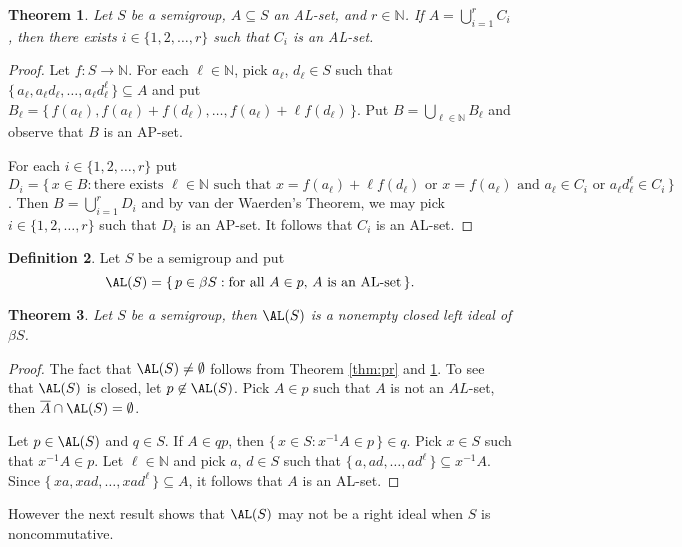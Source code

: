 \documentclass[12pt]{article}
\theoremstyle{plain}
\newtheorem{thm}{Theorem}[section]
\theoremstyle{definition}
\newtheorem{defn}[thm]{Definition}
\newcommand{\bbN}{\mathbb{N}}
\begin{document}
\begin{thm}
  \label{thm:vdwAL}
  Let $S$ be a semigroup, $A \subseteq S$ an AL-set, and $r \in \bbN$.
  If $A = \bigcup_{i=1}^r C_i$, then there exists $i \in \{1, 2,
  \ldots, r\}$ such that $C_i$ is an AL-set.
\end{thm}
\begin{proof}
  Let $f \colon S \to \bbN$.
  For each $\ell \in \bbN$, pick $a_\ell$, $d_\ell \in S$ such that
  $\{\, a_\ell, a_\ell d_\ell, \ldots, a_\ell d_\ell^\ell \,\}
  \subseteq A$ and put $B_\ell = \{\, f(a_\ell), f(a_\ell) +
  f(d_\ell), \ldots, f(a_\ell) + \ell f(d_\ell) \,\}$.
  Put $B = \bigcup_{\ell \in \bbN} B_\ell$ and observe that $B$ is an
  AP-set.
  
  For each $i \in \{1, 2, \ldots, r\}$ put $D_i = \{\, x \in B :
  \mbox{there exists $\ell \in \bbN$ such that $x = f(a_\ell) + \ell
    f(d_\ell)$ or $x = f(a_\ell)$ and $a_\ell \in C_i$ or $a_\ell
    d_\ell^\ell \in C_i$} \,\}$.
  Then $B = \bigcup_{i=1}^r D_i$ and by van der Waerden's Theorem, we
  may pick $i \in \{1, 2, \ldots, r\}$ such that $D_i$ is an AP-set.
  It follows that $C_i$ is an AL-set.
\end{proof}

\begin{defn}
  Let $S$ be a semigroup and put
  \[
    \AL(S) = \{\, p \in \beta S : \mbox{for all $A \in p$, $A$ is an
      AL-set} \,\}.
  \]
\end{defn}

\begin{thm}
  Let $S$ be a semigroup, then $\AL(S)$ is a nonempty closed left
  ideal of $\beta S$.
\end{thm}
\begin{proof}
  The fact that $\AL(S) \ne \emptyset$ follows from Theorem \ref{thm:pr}
  and \ref{thm:vdwAL}.
  To see that $\AL(S)$ is closed, let $p \not\in \AL(S)$.
  Pick $A \in p$ such that $A$ is not an $AL$-set, then $\overline{A}
  \cap \AL(S) = \emptyset$.

  Let $p \in \AL(S)$ and $q \in S$. 
  If $A \in qp$, then $\{\, x \in S : x^{-1}A \in p \,\} \in q$.
  Pick $x \in S$ such that $x^{-1}A \in p$.
  Let $\ell \in \bbN$ and pick $a$, $d \in S$ such that $\{\, a, ad,
  \ldots, ad^\ell \,\} \subseteq x^{-1}A$. 
  Since $\{\, xa, xad, \ldots, xad^\ell \,\} \subseteq A$, it follows
  that $A$ is an AL-set.
\end{proof}

However the next result shows that $\AL(S)$ may not be a right ideal
when $S$ is noncommutative.
\end{document}
